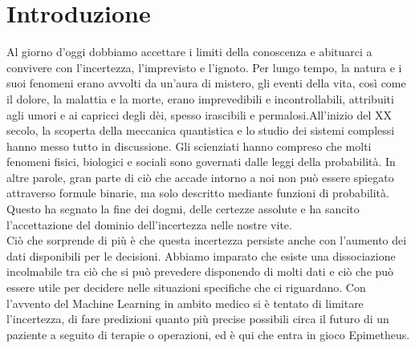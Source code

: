 \chapter{Introduzione}
\label{cap:introduzione}




Al giorno d'oggi dobbiamo accettare i limiti della conoscenza e abituarci a convivere con l'incertezza, l'imprevisto e l'ignoto. Per lungo tempo, la natura e i suoi fenomeni erano avvolti da un'aura di mistero, gli eventi della vita, così come il dolore, la malattia e la morte, erano imprevedibili e incontrollabili, attribuiti agli umori e ai capricci degli dèi, spesso irascibili e permalosi.All'inizio del XX secolo, la scoperta della meccanica quantistica e lo studio dei sistemi complessi hanno messo tutto in discussione. Gli scienziati hanno compreso che molti fenomeni fisici, biologici e sociali sono governati dalle leggi della probabilità. In altre parole, gran parte di ciò che accade intorno a noi non può essere spiegato attraverso formule binarie, ma solo descritto mediante funzioni di probabilità. Questo ha segnato la fine dei dogmi, delle certezze assolute e ha sancito l'accettazione del dominio dell'incertezza nelle nostre vite.\\

Ciò che sorprende di più è che questa incertezza persiste anche con l'aumento dei dati disponibili per le decisioni. Abbiamo imparato che esiste una dissociazione incolmabile tra ciò che si può prevedere disponendo di molti dati e ciò che può essere utile per decidere nelle situazioni specifiche che ci riguardano. 
Con l'avvento del Machine Learning in ambito medico si è tentato di limitare l'incertezza, di fare predizioni quanto più precise possibili circa il futuro di un paziente a seguito di terapie o operazioni, ed è qui che entra in gioco Epimetheus.\\

